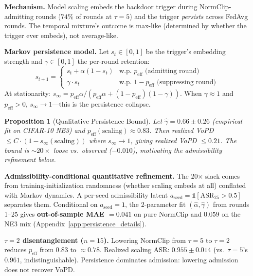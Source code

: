 \documentclass{article}
\newtheorem{myproposition}{Proposition}
\begin{document}
\textbf{Mechanism.} Model scaling embeds the backdoor trigger during NormClip-admitting rounds ($74\%$ of rounds at $\tau=5$) and the trigger \emph{persists} across FedAvg rounds. The temporal mixture's outcome is max-like (determined by whether the trigger ever embeds), not average-like.

\textbf{Markov persistence model.} Let $s_t \in [0,1]$ be the trigger's embedding strength and $\gamma \in [0,1]$ the per-round retention:
\begin{equation}
s_{t+1} = \begin{cases} s_t + \alpha(1-s_t) & \text{w.p. } p_{\text{eff}} \text{ (admitting round)} \\ \gamma \cdot s_t & \text{w.p. } 1-p_{\text{eff}} \text{ (suppressing round)} \end{cases}
\label{eq:persistence}
\end{equation}
At stationarity: $s_\infty = p_{\text{eff}} \alpha / (p_{\text{eff}} \alpha + (1-p_{\text{eff}})(1-\gamma))$. When $\gamma \approx 1$ and $p_{\text{eff}} > 0$, $s_\infty \to 1$---this is the persistence collapse.

\begin{myproposition}[Qualitative Persistence Bound]
\label{prop:persistence}
Let $\hat\gamma = 0.66 \pm 0.26$ (empirical fit on CIFAR-10 NE3) and $p_{\text{eff}}(\text{scaling}) \approx 0.83$. Then realized VoPD $\leq C \cdot (1 - s_\infty(\text{scaling}))$ where $s_\infty \to 1$, giving realized VoPD $\leq 0.21$. The bound is $\sim 20\times$ loose vs.\ observed ($-0.010$), motivating the admissibility refinement below.
\end{myproposition}

\textbf{Admissibility-conditional quantitative refinement.} The 20× slack comes from training-initialization randomness (whether scaling embeds at all) conflated with Markov dynamics. A per-seed admissibility latent $a_{\text{seed}} = \mathbb{1}[\text{ASR}_{25} > 0.5]$ separates them. Conditional on $a_{\text{seed}} = 1$, the 2-parameter fit $(\hat\alpha, \hat\gamma)$ from rounds 1--25 gives \textbf{out-of-sample MAE $= 0.041$} on pure NormClip and $0.059$ on the NE3 mix (Appendix~\ref{app:persistence_details}).

\textbf{$\tau{=}2$ disentanglement ($n=15$).} Lowering NormClip from $\tau=5$ to $\tau=2$ reduces $p_{\text{eff}}$ from $0.83$ to $\approx 0.78$. Realized scaling ASR: $0.955 \pm 0.014$ (vs.\ $\tau=5$'s $0.961$, indistinguishable). Persistence dominates admission: lowering admission does not recover VoPD.
\end{document}
